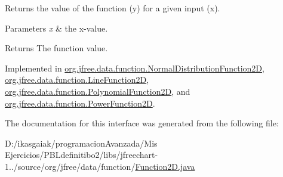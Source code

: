 Returns the value of the function (\textquotesingle{}y\textquotesingle{}) for a given input (\textquotesingle{}x\textquotesingle{}).


\begin{DoxyParams}{Parameters}
{\em x} & the x-\/value.\\
\hline
\end{DoxyParams}
\begin{DoxyReturn}{Returns}
The function value. 
\end{DoxyReturn}


Implemented in \mbox{\hyperlink{classorg_1_1jfree_1_1data_1_1function_1_1_normal_distribution_function2_d_ae9a646904dcbaaa779ee1426612613dd}{org.\+jfree.\+data.\+function.\+Normal\+Distribution\+Function2D}}, \mbox{\hyperlink{classorg_1_1jfree_1_1data_1_1function_1_1_line_function2_d_a964dd87401e1f11453022c5a95566657}{org.\+jfree.\+data.\+function.\+Line\+Function2D}}, \mbox{\hyperlink{classorg_1_1jfree_1_1data_1_1function_1_1_polynomial_function2_d_a636f8ebc39c8d62299e4a8d5a5325c14}{org.\+jfree.\+data.\+function.\+Polynomial\+Function2D}}, and \mbox{\hyperlink{classorg_1_1jfree_1_1data_1_1function_1_1_power_function2_d_a28cc5f0b43b89599f306191d83b99f6c}{org.\+jfree.\+data.\+function.\+Power\+Function2D}}.



The documentation for this interface was generated from the following file\+:\begin{DoxyCompactItemize}
\item 
D\+:/ikasgaiak/programacion\+Avanzada/\+Mis Ejercicios/\+P\+B\+Ldefinitibo2/libs/jfreechart-\/1../source/org/jfree/data/function/\mbox{\hyperlink{_function2_d_8java}{Function2\+D.\+java}}\end{DoxyCompactItemize}
